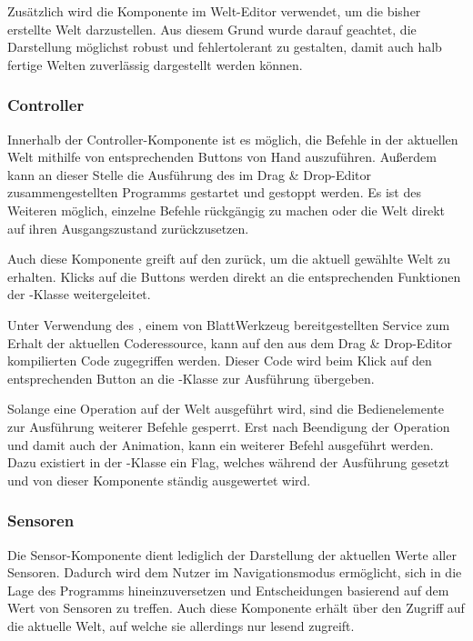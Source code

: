 Zusätzlich wird die Komponente im Welt-Editor verwendet, um die bisher erstellte Welt darzustellen. Aus diesem Grund wurde darauf geachtet, die Darstellung möglichst robust und fehlertolerant zu gestalten, damit auch halb fertige Welten zuverlässig dargestellt werden können.

\subsubsection{Controller}
\label{sec:implementation:integration:controller}

Innerhalb der Controller-Komponente ist es möglich, die Befehle in der aktuellen Welt mithilfe von entsprechenden Buttons von Hand auszuführen. Außerdem kann an dieser Stelle die Ausführung des im Drag \& Drop-Editor zusammengestellten Programms gestartet und gestoppt werden. Es ist des Weiteren möglich, einzelne Befehle rückgängig zu machen oder die Welt direkt auf ihren Ausgangszustand zurückzusetzen.

Auch diese Komponente greift auf den  zurück, um die aktuell gewählte Welt zu erhalten. Klicks auf die Buttons werden direkt an die entsprechenden Funktionen der -Klasse weitergeleitet.

Unter Verwendung des , einem von BlattWerkzeug bereitgestellten Service zum Erhalt der aktuellen Coderessource, kann auf den aus dem Drag \& Drop-Editor kompilierten Code zugegriffen werden. Dieser Code wird beim Klick auf den entsprechenden Button an die -Klasse zur Ausführung übergeben.

Solange eine Operation auf der Welt ausgeführt wird, sind die Bedienelemente zur Ausführung weiterer Befehle gesperrt. Erst nach Beendigung der Operation und damit auch der Animation, kann ein weiterer Befehl ausgeführt werden. Dazu existiert in der -Klasse ein Flag, welches während der Ausführung gesetzt und von dieser Komponente ständig ausgewertet wird.

\subsubsection{Sensoren}
\label{sec:implementation:integration:sensors}

Die Sensor-Komponente dient lediglich der Darstellung der aktuellen Werte aller Sensoren. Dadurch wird dem Nutzer im Navigationsmodus ermöglicht, sich in die Lage des Programms hineinzuversetzen und Entscheidungen basierend auf dem Wert von Sensoren zu treffen. Auch diese Komponente erhält über den  Zugriff auf die aktuelle Welt, auf welche sie allerdings nur lesend zugreift.

